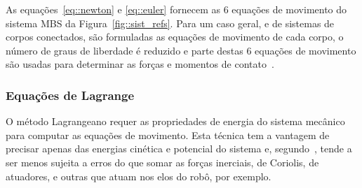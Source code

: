 As equações~\ref{eq::newton} e \ref{eq::euler} fornecem as 6 equações de
movimento do sistema MBS da Figura~\ref{fig::sist_refs}. Para um caso geral, e
de sistemas de corpos conectados, são formuladas as equações de movimento de
cada corpo, o número de graus de liberdade é reduzido e parte destas 6 equações
de movimento são usadas para determinar as forças e momentos de
contato~\cite{tenenbaum2006fundamentals}.







\subsubsection{Equações de Lagrange}

O método Lagrangeano requer as propriedades de energia do sistema mecânico para
computar as equações de movimento. Esta técnica tem a vantagem de precisar
apenas das energias cinética e potencial do sistema e,
segundo~\citet{murray1994mathematical}, tende a ser menos sujeita a erros do que
somar as forças inerciais, de Coriolis, de atuadores, e outras que atuam nos
elos do robô, por exemplo.

